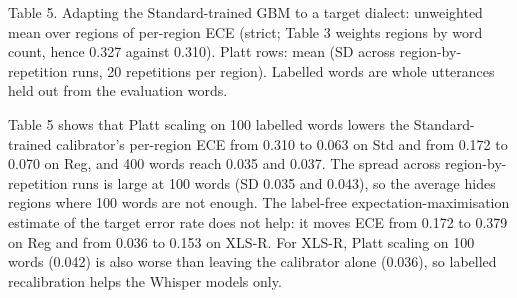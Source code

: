 \documentclass[10pt]{article}
\begin{document}
\begin{table}[htb]
\centering
\par\noindent\begin{minipage}{\linewidth}\small Table 5. Adapting the Standard-trained GBM to a target dialect: unweighted mean over regions of per-region ECE (strict; Table 3 weights regions by word count, hence 0.327 against 0.310). Platt rows: mean (SD across region-by-repetition runs, 20 repetitions per region). Labelled words are whole utterances held out from the evaluation words.\end{minipage}\par\smallskip
\small
{}
\end{table}


Table 5 shows that Platt scaling on 100 labelled words lowers the Standard-trained calibrator's per-region ECE from 0.310 to 0.063 on Std and from 0.172 to 0.070 on Reg, and 400 words reach 0.035 and 0.037. The spread across region-by-repetition runs is large at 100 words (SD 0.035 and 0.043), so the average hides regions where 100 words are not enough. The label-free expectation-maximisation estimate of the target error rate does not help: it moves ECE from 0.172 to 0.379 on Reg and from 0.036 to 0.153 on XLS-R. For XLS-R, Platt scaling on 100 words (0.042) is also worse than leaving the calibrator alone (0.036), so labelled recalibration helps the Whisper models only.
\end{document}
